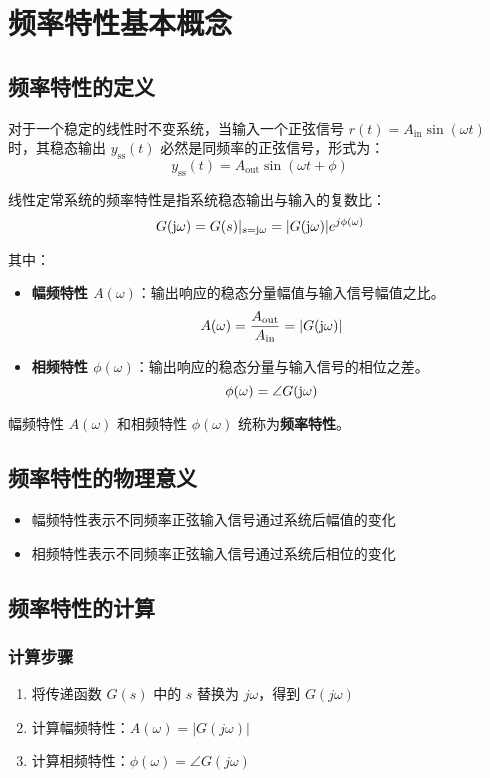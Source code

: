 \section{频率特性基本概念}

\subsection{频率特性的定义}
对于一个稳定的线性时不变系统，当输入一个正弦信号 $r(t) = A_{\text{in}}\sin(\omega t)$ 时，其稳态输出 $y_{\text{ss}}(t)$ 必然是同频率的正弦信号，形式为：
\[y_{\text{ss}}(t) = A_{\text{out}}\sin(\omega t + \phi)\]

线性定常系统的频率特性是指系统稳态输出与输入的复数比：
\[G(\mathrm{j}\omega) = G(s)|_{s=\mathrm{j}\omega} = |G(\mathrm{j}\omega)|e^{j\phi(\omega)}\]

其中：
\begin{itemize}
    \item \textbf{幅频特性 $A(\omega)$}：输出响应的稳态分量幅值与输入信号幅值之比。
    \[A(\omega) = \frac{A_{\text{out}}}{A_{\text{in}}} = |G(\mathrm{j}\omega)|\]
    \item \textbf{相频特性 $\phi(\omega)$}：输出响应的稳态分量与输入信号的相位之差。
    \[\phi(\omega) = \angle G(\mathrm{j}\omega)\]
\end{itemize}

幅频特性 $A(\omega)$ 和相频特性 $\phi(\omega)$ 统称为\textbf{频率特性}。

\subsection{频率特性的物理意义}
\begin{itemize}
    \item 幅频特性表示不同频率正弦输入信号通过系统后幅值的变化
    \item 相频特性表示不同频率正弦输入信号通过系统后相位的变化
\end{itemize}

\subsection{频率特性的计算}

\subsubsection{计算步骤}
\begin{enumerate}
    \item 将传递函数 $G(s)$ 中的 $s$ 替换为 $j\omega$，得到 $G(j\omega)$
    \item 计算幅频特性：$A(\omega) = |G(j\omega)|$
    \item 计算相频特性：$\phi(\omega) = \angle G(j\omega)$
\end{enumerate}

